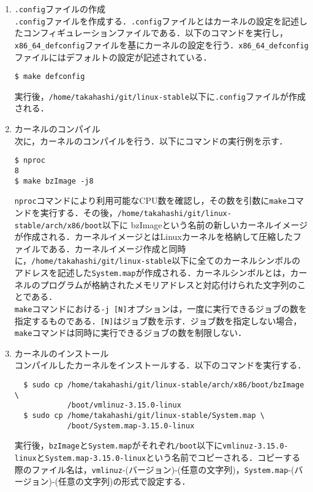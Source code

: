 \documentclass[12pt]{jsarticle}
\begin{document}
\begin{enumerate}
\item \verb|.config|ファイルの作成 \\
\verb|.config|ファイルを作成する．\verb|.config|ファイルとはカーネルの設定を記述したコンフィギュレーションファイルである．以下のコマンドを実行し，\verb|x86_64_defconfig|ファイルを基にカーネルの設定を行う．\verb|x86_64_defconfig|ファイルにはデフォルトの設定が記述されている．

\begin{verbatim}
$ make defconfig
\end{verbatim}
実行後，\verb|/home/takahashi/git/linux-stable|以下に\verb|.config|ファイルが作成される．

\item カーネルのコンパイル \\
次に，カーネルのコンパイルを行う．以下にコマンドの実行例を示す．

\newpage
\begin{verbatim}
$ nproc
8
$ make bzImage -j8
\end{verbatim}
\verb|nproc|コマンドにより利用可能なCPU数を確認し，その数を引数に\verb|make|コマンドを実行する．その後，\verb|/home/takahashi/git/linux-stable/arch/x86/boot|以下に
bzImageという名前の新しいカーネルイメージが作成される．カーネルイメージとはLinuxカーネルを格納して圧縮したファイルである．カーネルイメージ作成と同時に，\verb|/home/takahashi/git/linux-stable|以下に全てのカーネルシンボルのアドレスを記述した\verb|System.map|が作成される．カーネルシンボルとは，カーネルのプログラムが格納されたメモリアドレスと対応付けられた文字列のことである．\\
\verb|make|コマンドにおける\verb|-j [N]|オプションは，一度に実行できるジョブの数を指定するものである．\verb|[N]|はジョブ数を示す．ジョブ数を指定しない場合，\verb|make|コマンドは同時に実行できるジョブの数を制限しない．

\item カーネルのインストール \\
  コンパイルしたカーネルをインストールする．以下のコマンドを実行する．
\begin{verbatim}
  $ sudo cp /home/takahashi/git/linux-stable/arch/x86/boot/bzImage \
            /boot/vmlinuz-3.15.0-linux
  $ sudo cp /home/takahashi/git/linux-stable/System.map \
            /boot/System.map-3.15.0-linux
\end{verbatim}
実行後，\verb|bzImage|と\verb|System.map|がそれぞれ\verb|/boot|以下に\verb|vmlinuz-3.15.0-linux|と\verb|System.map-3.15.0-linux|という名前でコピーされる．コピーする際のファイル名は，\verb|vmlinuz|-(バージョン)-(任意の文字列)，\verb|System.map|-(バージョン)-(任意の文字列)の形式で設定する．


\end{enumerate}
\end{document}

